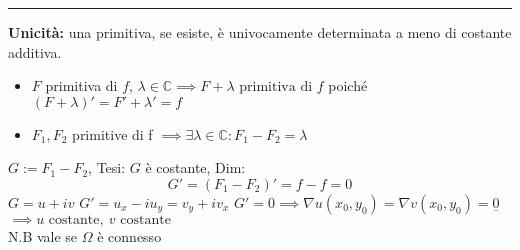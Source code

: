 \documentclass[a4paper]{article}
\newcommand{\C}{\mathbb{C}}
\begin{document}
\noindent\rule{\textwidth}{0.5pt}
\textbf{Unicità: }una primitiva, se esiste, è univocamente determinata a meno di costante additiva.
\begin{itemize}
	\item $F$ primitiva di $f$, $\lambda\in\C\implies F+\lambda \text{ primitiva di }f$ poiché $(F+\lambda)'=F'+\lambda'=f$
	\item $F_1,F_2$ primitive di f $\implies\exists \lambda\in\C:F_1-F_2=\lambda$
\end{itemize}
$G:=F_1-F_2$, Tesi: $G$ è costante, Dim: \[G'=(F_1-F_2)'=f-f=0\]
$G=u+iv$ $G'=u_x-iu_y=v_y+iv_x$ $G'=0\implies \nabla u(x_0,y_0)=\nabla v(x_0,y_0)=\underline 0$
\\$\implies u \text{ costante},\ v \text{ costante}$
\\N.B vale se $\Omega$ è connesso 
\end{document}
